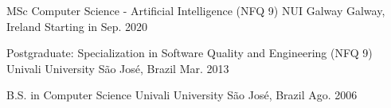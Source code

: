 

\begin{cventries}

  \cventry
    {MSc Computer Science - Artificial Intelligence (NFQ 9)} %
    {NUI Galway} %
    {Galway, Ireland} %
    {Starting in Sep. 2020} %
    {}

  \cventry
    {Postgraduate: Specialization in Software Quality and Engineering (NFQ 9)} %
    {Univali University} %
    {São José, Brazil} %
    {Mar. 2013} %
    {}

  \cventry
    {B.S. in Computer Science} %
    {Univali University} %
    {São José, Brazil} %
    {Ago. 2006} %
    {}

\end{cventries}
